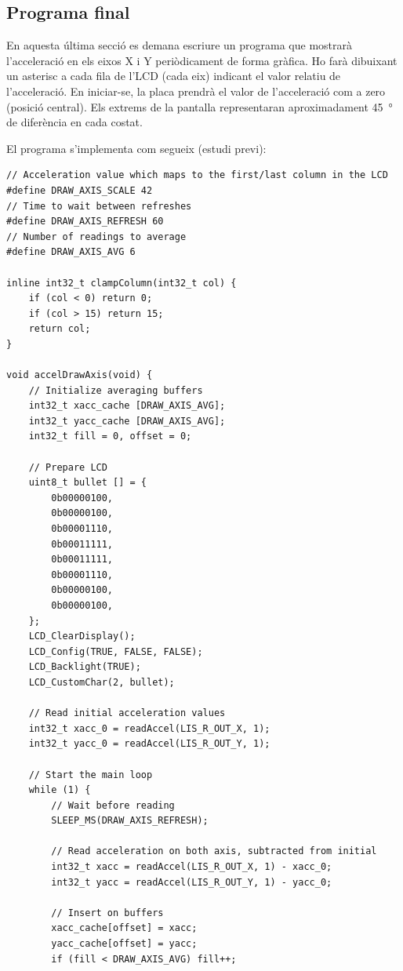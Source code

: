 \subsection{Programa final}

En aquesta última secció es demana escriure un programa que mostrarà l'acceleració en els
eixos X i Y periòdicament de forma gràfica. Ho farà dibuixant un asterisc a cada fila de
l'LCD (cada eix) indicant el valor relatiu de l'acceleració. En iniciar-se, la placa prendrà
el valor de l'acceleració com a zero (posició central). Els extrems de la pantalla representaran
aproximadament \SI{45}{\degree} de diferència en cada costat.

El programa s'implementa com segueix (estudi previ):

\begin{verbatim}
// Acceleration value which maps to the first/last column in the LCD
#define DRAW_AXIS_SCALE 42
// Time to wait between refreshes
#define DRAW_AXIS_REFRESH 60
// Number of readings to average
#define DRAW_AXIS_AVG 6

inline int32_t clampColumn(int32_t col) {
    if (col < 0) return 0;
    if (col > 15) return 15;
    return col;
}

void accelDrawAxis(void) {
    // Initialize averaging buffers
    int32_t xacc_cache [DRAW_AXIS_AVG];
    int32_t yacc_cache [DRAW_AXIS_AVG];
    int32_t fill = 0, offset = 0;

    // Prepare LCD
    uint8_t bullet [] = {
        0b00000100,
        0b00000100,
        0b00001110,
        0b00011111,
        0b00011111,
        0b00001110,
        0b00000100,
        0b00000100,
    };
    LCD_ClearDisplay();
    LCD_Config(TRUE, FALSE, FALSE);
    LCD_Backlight(TRUE);
    LCD_CustomChar(2, bullet);

    // Read initial acceleration values
    int32_t xacc_0 = readAccel(LIS_R_OUT_X, 1);
    int32_t yacc_0 = readAccel(LIS_R_OUT_Y, 1);

    // Start the main loop
    while (1) {
        // Wait before reading
        SLEEP_MS(DRAW_AXIS_REFRESH);

        // Read acceleration on both axis, subtracted from initial
        int32_t xacc = readAccel(LIS_R_OUT_X, 1) - xacc_0;
        int32_t yacc = readAccel(LIS_R_OUT_Y, 1) - yacc_0;

        // Insert on buffers
        xacc_cache[offset] = xacc;
        yacc_cache[offset] = yacc;
        if (fill < DRAW_AXIS_AVG) fill++;


\end{verbatim}
